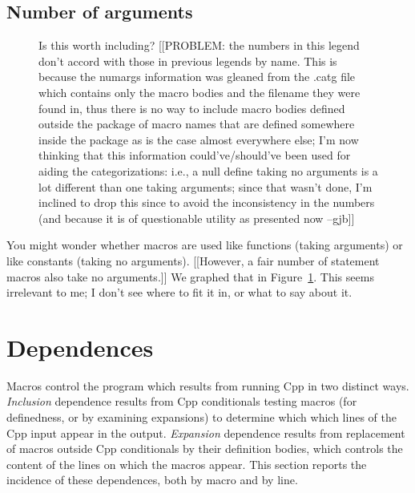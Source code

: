 \documentclass[10pt]{article}
\newcommand{\captionsmall}[1]{\caption[]{\small #1}}
\begin{document}


\subsection{Number of arguments}

\begin{figure}
\centerline{}
\captionsmall{Is this worth including?
  [[PROBLEM:  the numbers in this legend don't accord with those in
  previous legends by name.  This is because the numargs information was
  gleaned from the .catg file which contains only the macro bodies and
  the filename they were found in, thus there is no way to include macro
  bodies defined outside the package of macro names that are defined
  somewhere inside the package as is the case almost everywhere else;
  I'm now thinking that this information could've/should've been used
  for aiding the categorizations: i.e., a null define taking no
  arguments is a lot different than one taking arguments;  since that
  wasn't done, I'm inclined to drop this since to avoid the
  inconsistency in the numbers (and because it is of questionable
  utility as presented now --gjb]]}
\label{fig:cat-numargs}
\end{figure}


You might wonder whether macros are used like functions (taking arguments)
or like constants (taking no arguments).  
[[However, a fair number of statement macros also take no arguments.]]
We graphed that in
Figure~\ref{fig:cat-numargs}.  This seems irrelevant to me; I don't see
where to fit it in, or what to say about it.



\section{Dependences}
\label{sec:dependence}
\label{sec:last-content-section}

Macros control the program which results from running Cpp in two distinct
ways.  {\em Inclusion} dependence results from Cpp conditionals testing
macros (for definedness, or by examining expansions) to determine which
which lines of the Cpp input appear in the output.  {\em Expansion}
dependence results from replacement of macros outside Cpp conditionals by
their definition bodies, which controls the content of the lines on which
the macros appear.  This section reports the incidence of these
dependences, both by macro and by line.
\end{document}
